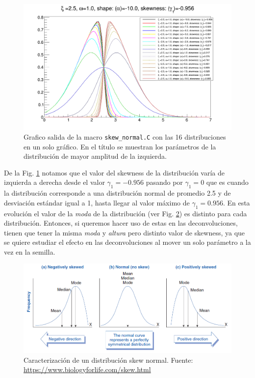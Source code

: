 \documentclass[11pt,letterpaper]{article}
\begin{document}
 \begin{figure}[H]
    \includegraphics[width=1.\textwidth]{img/skew_normal_dist_same.png}
    \centering
     \cprotect\caption{Grafico salida de la macro \verb|skew_normal.C| con las 16 distribuciones en un solo gráfico. En el título se muestran los parámetros de la distribución de mayor amplitud de la izquierda.} 
\label{skew_normal_dist_same}
\end{figure}

De la Fig. \ref{skew_normal_dist_same} notamos que el valor del skewness de la distribución varía de izquierda a derecha desde el valor $\gamma_1=-0.956$ pasando por $\gamma_1=0$ que es cuando la distribución corresponde a una distribución normal de promedio 2.5 y de desviación estándar igual a 1, hasta llegar al valor máximo de $\gamma_1=0.956$. En esta evolución el valor de la \textit{moda} de la distribución (ver Fig.
\ref{skew_normal_dist_parameters}) es distinto para cada distribución. Entonces, si queremos hacer uso de estas en las deconvoluciones, tienen que tener la misma \textit{moda} y \textit{altura} pero distinto valor de skewness, ya que se quiere estudiar el efecto en las deconvoluciones al mover un solo parámetro a la vez en la semilla.

 \begin{figure}[H]
    \includegraphics[width=1.\textwidth]{img/skew_normal_parameters.png}
    \centering
     \cprotect\caption{Caracterización de un distribución skew normal. Fuente: \url{https://www.biologyforlife.com/skew.html} } 
\label{skew_normal_dist_parameters}
\end{figure}
\end{document}

